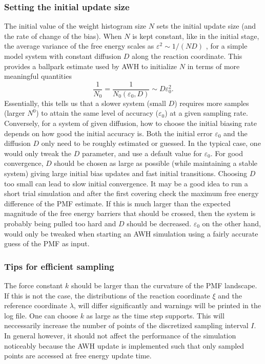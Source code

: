 \subsubsection{Setting the initial update size}
The initial value of  the weight histogram size $N$ sets the initial update size (and the rate of change of the bias).
When $N$ is kept constant, like  in the initial stage,
the average variance of the free energy scales as $\varepsilon^2 \sim 1/(ND)$ \cite{lindahl2014accelerated},
for a simple model system with constant diffusion $D$ along the reaction coordinate.
This provides a ballpark estimate used by AWH to initialize $N$ in terms of more meaningful quantities
\begin{equation}\label{eq:awh:n0}
\frac{1}{N_0} = \frac{1}{N_0(\varepsilon_0, D)} \sim D\varepsilon_0^2. 
\end{equation}
Essentially, this tells us that  a slower system (small $D$) requires more samples (larger $N^0$) 
to attain the same level of accuracy ($\varepsilon_0$) at a given sampling rate.
Conversely, for a system of given diffusion, how to choose the initial biasing rate depends on how good the initial
accuracy is.
Both the initial error $\varepsilon_0$ and the diffusion $D$ only need to be roughly estimated or guessed.  In the typical case, one would only tweak the $D$ parameter,
and use  a default value for $\varepsilon_0$.
For good convergence, $D$ should be chosen as large as possible (while maintaining a stable system)
giving large initial bias updates and fast initial transitions.
Choosing $D$ too small can lead to slow initial convergence.
It may be a good idea to run a short trial simulation and after the first covering check the maximum free energy difference of the PMF estimate.
If this is much larger than the expected magnitude of the free energy barriers that should be crossed,
then the system is probably being pulled too hard and $D$ should be decreased.
$\varepsilon_0$ on the other hand, would only be tweaked when starting an AWH simulation using a fairly accurate guess of the PMF as input.

\subsubsection{Tips for efficient sampling}
The force constant $k$ should be larger than the curvature of the PMF landscape. 
If this is not the case, the distributions of the reaction coordinate $\xi$ and the reference coordinate $\lambda$, 
will differ significantly and warnings will be printed in the log file. 
One can choose $k$ as large as the time step supports.
This will neccessarily increase the number of points of the discretized sampling interval $I$.
In general however, it should not affect the performance of the simulation noticeably because the AWH update is implemented such that
only sampled points are accessed at free energy update time.

